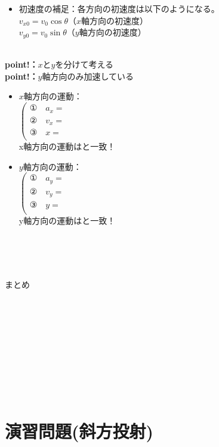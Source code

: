 \documentclass[11pt,twoside]{article}
\begin{document}
\begin{minipage}[t]{0.52\linewidth}
\begin{itemize}[leftmargin=2em,itemsep=0pt,topsep=2pt]
					\item[(iv)]
					初速度の補足：各方向の初速度は以下のようになる。\\
					$v_{x0} = v_0\cos\theta$（$x$軸方向の初速度）\\
					$v_{y0} = v_0\sin\theta$（$y$軸方向の初速度）\\
				\end{itemize}
			　\\
			\textbf{point!：}$x$と$y$を分けて考える\\
			\textbf{point!：}$y$軸方向のみ加速している
			\begin{itemize}[leftmargin=2em,itemsep=0pt,topsep=2pt]
				\item[(i)]
				$x$軸方向の運動：\\
				\(
				\left(
				\begin{array}{ll}
					\text{①} \quad a_x = & \\
					\text{②} \quad v_x = & \\
					\text{③} \quad x = & \\
				\end{array}
				\right.
				\)\\
				\to x軸方向の運動は\underline{\hspace{3.5cm}}と一致！\\
				\item[(ii)]
				$y$軸方向の運動：\\
				\(
				\left(
				\begin{array}{ll}
					\text{①} \quad a_y = & \\
					\text{②} \quad v_y = & \\
					\text{③} \quad y = & \\
				\end{array}
				\right.
				\)\\
				\to y軸方向の運動は\underline{\hspace{3.5cm}}と一致！
			\end{itemize}
	\end{minipage}\\\\\\
	\begin{shadebox}
		まとめ\\\\\\\\\\\\\\\\\\\\
	\end{shadebox}
	\clearpage

	\section{演習問題(斜方投射)}
	\clearpage
\end{document}
